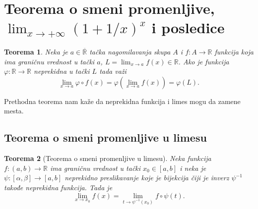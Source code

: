 \documentclass[a4paper,12pt]{article}
\theoremstyle{plain}
\newtheorem{theorem}{Teorema}[section]
\theoremstyle{definition}
\theoremstyle{remark}
\begin{document}
\section{Teorema o smeni promenljive, \texorpdfstring{$\displaystyle\lim_{x\to+\infty} (1 + 1/x)^x$}{lim(1+1/x)\textasciicircum x} i posledice}
\begin{theorem}
    Neka je $a \in \overline{\mathbb{R}}$ tačka nagomilavanja skupa $A$ i $f : A \to \mathbb{R}$ funkcija koja ima graničnu vrednost u tački $a$, $L = \displaystyle \lim_{x \to a} f(x) \in \mathbb{R}$. Ako je funkcija $\varphi : \mathbb{R} \to \mathbb{R}$ neprekidna u tački $L$ tada važi
    \[ \lim_{x \to a} \varphi \circ f(x) = \varphi\left(\lim_{x \to a} f(x)\right) = \varphi(L). \]
\end{theorem}

Prethodna teorema nam kaže da neprekidna funkcija i limes mogu da zamene mesta.
\subsection{Teorema o smeni promenljive u limesu}
\begin{theorem}[Teorema o smeni promenljive u limesu]
    Neka funkcija $f : (a,b) \to \mathbb{R}$ ima graničnu vrednost u tački $x_0 \in [a,b]$ i neka je $\psi : [\alpha, \beta] \to [a,b]$ neprekidno preslikavanje koje je bijekcija čiji je inverz $\psi^{-1}$ takođe neprekidna funkcija. Tada je
    \[ \lim_{x \to x_0} f(x) = \lim_{t \to \psi^{-1}(x_0)} f \circ \psi(t). \]
\end{theorem}
\end{document}
